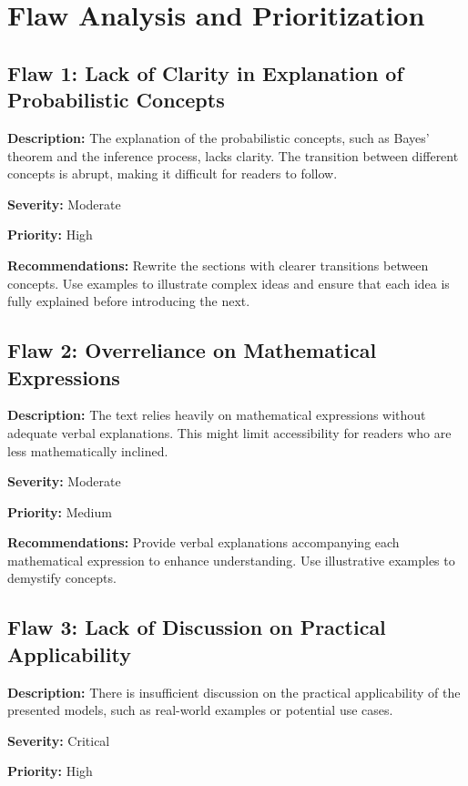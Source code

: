 \documentclass{article}
\begin{document}
\section*{Flaw Analysis and Prioritization}

\subsection*{Flaw 1: Lack of Clarity in Explanation of Probabilistic Concepts}

\textbf{Description:} 
The explanation of the probabilistic concepts, such as Bayes' theorem and the inference process, lacks clarity. The transition between different concepts is abrupt, making it difficult for readers to follow.

\textbf{Severity:} 
Moderate

\textbf{Priority:} 
High

\textbf{Recommendations:} 
Rewrite the sections with clearer transitions between concepts. Use examples to illustrate complex ideas and ensure that each idea is fully explained before introducing the next.

\subsection*{Flaw 2: Overreliance on Mathematical Expressions}

\textbf{Description:} 
The text relies heavily on mathematical expressions without adequate verbal explanations. This might limit accessibility for readers who are less mathematically inclined.

\textbf{Severity:} 
Moderate

\textbf{Priority:} 
Medium

\textbf{Recommendations:} 
Provide verbal explanations accompanying each mathematical expression to enhance understanding. Use illustrative examples to demystify concepts.

\subsection*{Flaw 3: Lack of Discussion on Practical Applicability}

\textbf{Description:} 
There is insufficient discussion on the practical applicability of the presented models, such as real-world examples or potential use cases.

\textbf{Severity:} 
Critical

\textbf{Priority:} 
High
\end{document}
